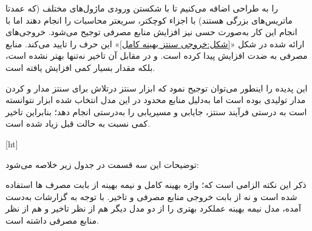 را به طراحی اضافه می‌کنیم تا با شکستن ورودی ماژول‌های مختلف (که عمدتا ماتریس‌های بزرگی هستند) با اجزاء کوچکتر، سریعتر محاسبات را انجام دهند اما با انجام این کار به‌صورت حسی نیز افزایش منابع مصرفی توجیح می‌شود. خروجی‌های ارائه شده در شکل «\ref{شکل:خروجی سنتز بهینه کامل}» این حرف را تایید می‌کند. منابع مصرفی به ضدت افزایش پیدا کرده است. و در مقابل آن تاخیر نه‌تنها بهتر نشده است، بلکه مقدار بسیار کمی افزایش یافته است.

این پدیده را اینطور می‌توان توجیح نمود که ابزار سنتز درتلاش برای سنتز مدار و  کردن مدار تولیدی بوده است اما به‌دلیل منابع محدود در این مدل  انتخاب شده
ابزار نتوانسته است به درستی فرآیند سنتز، جایابی و مسیریابی را به‌درستی انجام دهد؛ بنابراین تاخیر کمی نسبت به حالت قبل زیاد شده است.


[ht]



توضیحات این سه قسمت در جدول زیر خلاصه می‌شود: \\


\begin{table}[ht]
	\centering
	\caption{اطلاعات مربوط به معماری‌های مختلف}
\end{table}


ذکر این نکته الزامی است که؛ واژه بهینه کامل و نیمه بهینه از بابت مصرف  ها استفاده شده است و نه از بابت خروجی منابع مصرفی و تاخیر. با توجه به گزارشات به‌دست آمده، مدل نیمه بهینه عملکرد بهتری را از دو مدل دیگر هم از نظر تاخیر و هم از نظر منابع مصرفی داشته است.


